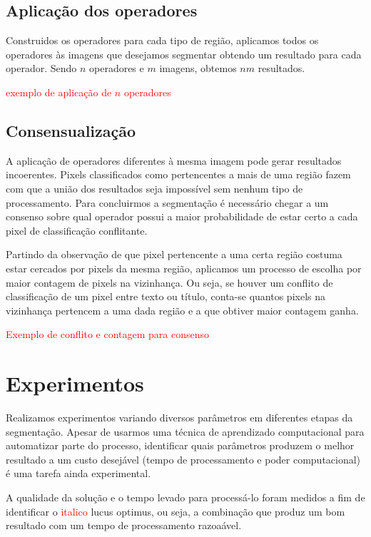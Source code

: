 \documentclass[a4paper,11pt]{article}
\newcommand{\TODO}[1]{\textcolor{red}{#1}}
\begin{document}
    \subsection{Aplicação dos operadores}

      Construidos os operadores para cada tipo de região, aplicamos todos os operadores às imagens que desejamos segmentar obtendo um resultado para cada operador. Sendo $n$ operadores e $m$ imagens, obtemos $nm$ resultados.

      \TODO{exemplo de aplicação de $n$ operadores}

    \subsection{Consensualização}

      A aplicação de operadores diferentes à mesma imagem pode gerar resultados incoerentes. Pixels classificados como pertencentes a mais de uma região fazem com que a união dos resultados seja impossível sem nenhum tipo de processamento. Para concluirmos a segmentação é necessário chegar a um consenso sobre qual operador possui a maior probabilidade de estar certo a cada pixel de classificação conflitante.

      Partindo da observação de que pixel pertencente a uma certa região costuma estar cercados por pixels da mesma região, aplicamos um processo de escolha por maior contagem de pixels na vizinhança. Ou seja, se houver um conflito de classificação de um pixel entre texto ou título, conta-se quantos pixels na vizinhança pertencem a uma dada região e a que obtiver maior contagem ganha.

      \TODO{Exemplo de conflito e contagem para consenso}

\section{Experimentos}

  Realizamos experimentos variando diversos parâmetros em diferentes etapas da segmentação. Apesar de usarmos uma técnica de aprendizado computacional para automatizar parte do processo, identificar quais parâmetros produzem o melhor resultado a um custo desejável (tempo de processamento e poder computacional) é uma tarefa ainda experimental.

  A qualidade da solução e o tempo levado para processá-lo foram medidos a fim de identificar o \TODO{italico} lucus optimus, ou seja, a combinação que produz um bom resultado com um tempo de processamento razoaável.
\end{document}
